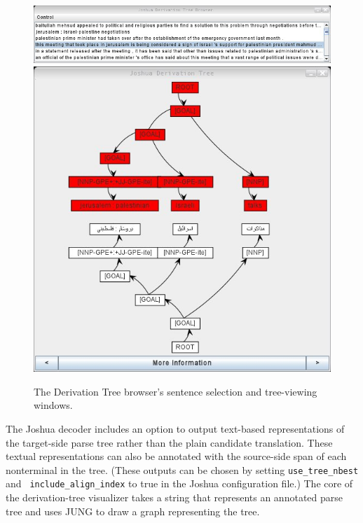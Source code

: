 \documentclass[nologo]{pbml}
\begin{document}
\begin{figure}
\includegraphics[width=.95\linewidth]{images/pick-window-2} 
\includegraphics[width=\linewidth]{images/urdu-tree-window}
\caption{The Derivation Tree browser's sentence selection and tree-viewing windows.}
\label{derivation-figure}
\end{figure}


The Joshua decoder includes an option to output text-based representations
of the target-side parse tree rather than the plain candidate translation.
These textual representations can also be annotated with the source-side
span of each nonterminal in the tree. 
(These outputs can be chosen by setting {\tt use\_tree\_nbest} and {\tt 
include\_align\_index} to true in the Joshua configuration
file.)
The core of the derivation-tree visualizer
 takes a string that represents an annotated parse tree and uses JUNG to draw
a graph representing the tree.
\end{document}
